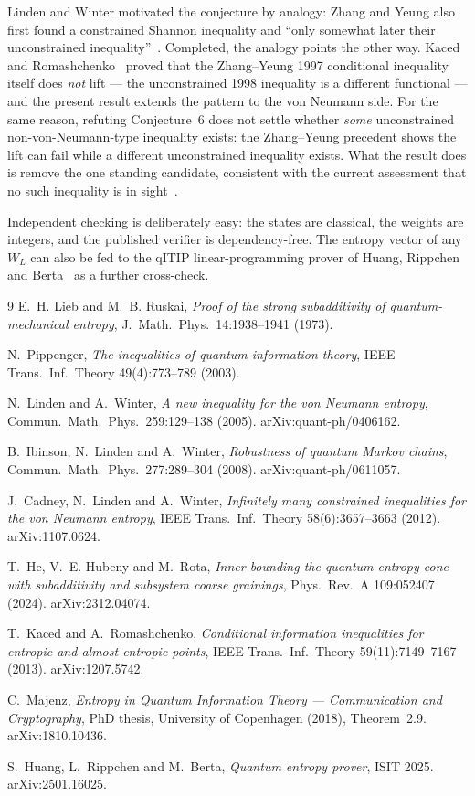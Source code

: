 \documentclass[11pt]{article}
\theoremstyle{remark}
\begin{document}
Linden and Winter motivated the conjecture by analogy: Zhang and Yeung also first found a
constrained Shannon inequality and ``only somewhat later their unconstrained
inequality''~\cite{LindenWinter2005}. Completed, the analogy points the other way. Kaced
and Romashchenko~\cite{KR2013} proved that the Zhang--Yeung 1997 conditional inequality
itself does \emph{not} lift --- the unconstrained 1998 inequality is a different
functional --- and the present result extends the pattern to the von Neumann side. For
the same reason, refuting Conjecture~6 does not settle whether \emph{some} unconstrained
non-von-Neumann-type inequality exists: the Zhang--Yeung precedent shows the lift can
fail while a different unconstrained inequality exists. What the result does is remove
the one standing candidate, consistent with the current assessment that no such
inequality is in sight~\cite{HHR2024}.

Independent checking is deliberately easy: the states are classical, the weights are
integers, and the published verifier is dependency-free. The entropy vector of any $W_L$
can also be fed to the qITIP linear-programming prover of Huang, Rippchen and
Berta~\cite{HRB2025} as a further cross-check.

\begin{thebibliography}{9}
 E.~H. Lieb and M.~B. Ruskai,
\emph{Proof of the strong subadditivity of quantum-mechanical entropy},
J.~Math.~Phys.\ 14:1938--1941 (1973).

 N.~Pippenger,
\emph{The inequalities of quantum information theory},
IEEE Trans.\ Inf.\ Theory 49(4):773--789 (2003).

 N.~Linden and A.~Winter,
\emph{A new inequality for the von Neumann entropy},
Commun.\ Math.\ Phys.\ 259:129--138 (2005). arXiv:quant-ph/0406162.

 B.~Ibinson, N.~Linden and A.~Winter,
\emph{Robustness of quantum Markov chains},
Commun.\ Math.\ Phys.\ 277:289--304 (2008). arXiv:quant-ph/0611057.

 J.~Cadney, N.~Linden and A.~Winter,
\emph{Infinitely many constrained inequalities for the von Neumann entropy},
IEEE Trans.\ Inf.\ Theory 58(6):3657--3663 (2012). arXiv:1107.0624.

 T.~He, V.~E. Hubeny and M.~Rota,
\emph{Inner bounding the quantum entropy cone with subadditivity and subsystem coarse
grainings}, Phys.\ Rev.\ A 109:052407 (2024). arXiv:2312.04074.

 T.~Kaced and A.~Romashchenko,
\emph{Conditional information inequalities for entropic and almost entropic points},
IEEE Trans.\ Inf.\ Theory 59(11):7149--7167 (2013). arXiv:1207.5742.

 C.~Majenz,
\emph{Entropy in Quantum Information Theory --- Communication and Cryptography},
PhD thesis, University of Copenhagen (2018), Theorem~2.9. arXiv:1810.10436.

 S.~Huang, L.~Rippchen and M.~Berta,
\emph{Quantum entropy prover}, ISIT 2025. arXiv:2501.16025.
\end{thebibliography}
\end{document}
